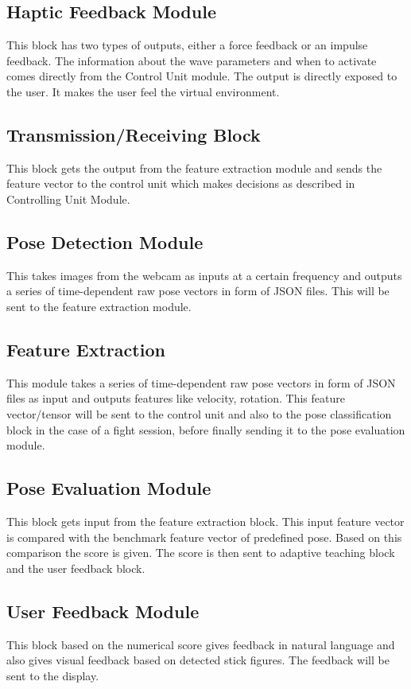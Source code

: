 \subsection{Haptic Feedback Module}
This block has two types of outputs, either a force feedback or an impulse feedback. The information about the wave parameters and when to activate comes directly from the Control Unit module. The output is directly exposed to the user. It makes the user feel the virtual environment.
\subsection{Transmission/Receiving Block}
This block gets the output from the feature extraction module and sends the feature vector to the control unit which makes decisions as described in Controlling Unit Module.
\subsection{Pose Detection Module}
This takes images from the webcam as inputs at a certain frequency and outputs a series of time-dependent raw pose vectors in form of JSON files. This will be sent to the feature extraction module.
\subsection{Feature Extraction}
This module takes a series of time-dependent raw pose vectors in form of JSON files as input and outputs features like velocity, rotation. This feature vector/tensor will be sent to the control unit and also to the pose classification block in the case of a fight session, before finally sending it to the pose evaluation module.
\subsection{Pose Evaluation Module}
This block gets input from the feature extraction block. This input feature vector is compared with the benchmark feature vector of predefined pose. Based on this comparison the score is given. The score is then sent to adaptive teaching block and the user feedback block.
\subsection{User Feedback Module}
This block based on the numerical score gives feedback in natural language and also gives visual feedback based on detected stick figures. The feedback will be sent to the display.
